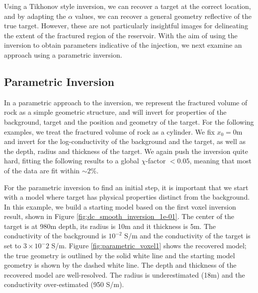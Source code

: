 

Using a Tikhonov style inversion, we can recover a target at the correct location, and by adapting the $\alpha$ values, we can recover a general geometry reflective of the true target. However, these are not particularly insightful images for delineating the extent of the fractured region of the reservoir. With the aim of using the inversion to obtain parameters indicative of the injection, we next examine an approach using a parametric inversion.
\subsection{Parametric Inversion}
In a parametric approach to the inversion, we represent the fractured volume of rock as a simple geometric structure, and will invert for properties of the background, target and the position and geometry of the target. For the following examples, we treat the fractured volume of rock as a cylinder. We fix $x_0 = 0$m and invert for the log-conductivity of the background and the target, as well as the depth, radius and thickness of the target. We again push the inversion quite hard, fitting the following results to a global $\chi$-factor $<0.05$, meaning that most of the data are fit within $\sim 2\%$.

For the parametric inversion to find an initial step, it is important that we start with a model where target has physical properties distinct from the background. In this example, we build a starting model based on the first voxel inversion result, shown in Figure \ref{fig:dc_smooth_inversion_1e-01}. The center of the target is at 980m depth, its radius is 10m and it thickness is 5m. The conductivity of the background is $10^{-2}$ S/m and the conductivity of the target is set to $3 \times 10^-2$ S/m. Figure \ref{fig:parametric_voxel1} shows the recovered model; the true geometry is outlined by the solid white line and the starting model geometry is shown by the dashed white line. The depth and thickness of the recovered model are well-resolved. The radius is underestimated (18m) and the conductivity over-estimated (950 S/m).





